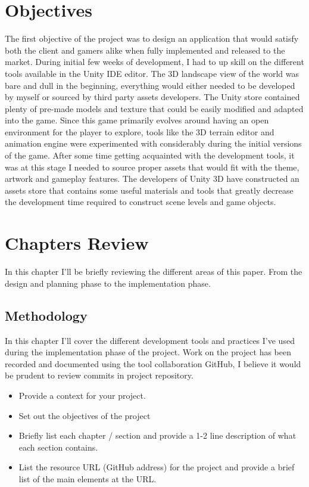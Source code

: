 \section{Objectives}
The first objective of the project was to design an application that would satisfy both the client and gamers alike when fully implemented and released to the market. During initial few weeks of development, I had to up skill on the different tools available in the Unity IDE editor. The 3D landscape view of the world was bare and dull in the beginning, everything would either needed to be developed by myself or sourced by third party assets developers. The Unity store contained plenty of pre-made models and texture that could be easily modified and adapted into the game.
Since this game primarily evolves around having an open environment for the player to explore, tools like the 3D terrain editor and animation engine were experimented with considerably during the initial versions of the game. 
After some time getting acquainted with the development tools, it was at this stage I needed to source proper assets that would fit with the theme, artwork and gameplay features. The developers of Unity 3D have constructed an assets store that contains some useful materials and tools that greatly decrease the development time required to construct scene levels and game objects.
\section{Chapters Review}
In this chapter I'll be briefly reviewing the different areas of this paper. From the design and planning phase to the implementation phase.
\subsection{Methodology}
In this chapter I'll cover the different development tools and practices I've used during the implementation phase of the project. Work on the project has been recorded and documented using the tool collaboration GitHub, I believe it would be prudent to review commits in project repository.
\begin{itemize}
	\item Provide a context for your project.
	\item Set out the objectives of the project
	\item Briefly list each chapter / section and provide a 1-2 line description of what each section contains.
	\item List the resource URL (GitHub address) for the project and provide a brief list of the main elements at the URL.
\end{itemize}

